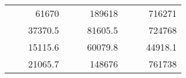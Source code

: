 \begin{table}[H]
\begin{tabular}{|ccrccrccc}
\rowcolor[HTML]{DDFDFF} 
\multicolumn{1}{|c|}{\cellcolor[HTML]{FFFFC7}}                                & \multicolumn{1}{c|}{\cellcolor[HTML]{DDFDFF}}                      & \multicolumn{1}{r|}{\cellcolor[HTML]{DAE8FC}61670}     & \multicolumn{1}{c|}{\cellcolor[HTML]{FFFFC7}}                                & \multicolumn{1}{c|}{\cellcolor[HTML]{DDFDFF}}                       & \multicolumn{1}{r|}{\cellcolor[HTML]{DDFDFF}189618}    & \multicolumn{1}{c|}{\cellcolor[HTML]{FFFFC7}}                                & \multicolumn{1}{c|}{\cellcolor[HTML]{DDFDFF}}                      & \multicolumn{1}{r|}{\cellcolor[HTML]{DDFDFF}716271}    \\ \cline{3-3} \cline{6-6} \cline{9-9} 
\multicolumn{1}{|c|}{\cellcolor[HTML]{FFFFC7}}                                & \multicolumn{1}{c|}{\cellcolor[HTML]{DDFDFF}}                      & \multicolumn{1}{r|}{\cellcolor[HTML]{DDFDFF}37370.5}   & \multicolumn{1}{c|}{\cellcolor[HTML]{FFFFC7}}                                & \multicolumn{1}{c|}{\cellcolor[HTML]{DDFDFF}}                       & \multicolumn{1}{r|}{\cellcolor[HTML]{DAE8FC}81605.5}   & \multicolumn{1}{c|}{\cellcolor[HTML]{FFFFC7}}                                & \multicolumn{1}{c|}{\cellcolor[HTML]{DDFDFF}}                      & \multicolumn{1}{r|}{\cellcolor[HTML]{DAE8FC}724768}    \\ \cline{3-3} \cline{6-6} \cline{9-9} 
\rowcolor[HTML]{DDFDFF} 
\multicolumn{1}{|c|}{\cellcolor[HTML]{FFFFC7}}                                & \multicolumn{1}{c|}{\cellcolor[HTML]{DDFDFF}}                      & \multicolumn{1}{r|}{\cellcolor[HTML]{DAE8FC}15115.6}   & \multicolumn{1}{c|}{\cellcolor[HTML]{FFFFC7}}                                & \multicolumn{1}{c|}{\cellcolor[HTML]{DDFDFF}}                       & \multicolumn{1}{r|}{\cellcolor[HTML]{DDFDFF}60079.8}   & \multicolumn{1}{c|}{\cellcolor[HTML]{FFFFC7}}                                & \multicolumn{1}{c|}{\cellcolor[HTML]{DDFDFF}}                      & \multicolumn{1}{r|}{\cellcolor[HTML]{DDFDFF}44918.1}   \\ \cline{3-3} \cline{6-6} \cline{9-9} 
\multicolumn{1}{|c|}{\cellcolor[HTML]{FFFFC7}}                                & \multicolumn{1}{c|}{\cellcolor[HTML]{DDFDFF}}                      & \multicolumn{1}{r|}{\cellcolor[HTML]{DDFDFF}21065.7}   & \multicolumn{1}{c|}{\cellcolor[HTML]{FFFFC7}}                                & \multicolumn{1}{c|}{\cellcolor[HTML]{DDFDFF}}                       & \multicolumn{1}{r|}{\cellcolor[HTML]{DAE8FC}148676}    & \multicolumn{1}{c|}{\cellcolor[HTML]{FFFFC7}}                                & \multicolumn{1}{c|}{\cellcolor[HTML]{DDFDFF}}                      & \multicolumn{1}{r|}{\cellcolor[HTML]{DAE8FC}761738}    \\ \cline{3-3} \cline{6-6} \cline{9-9} 

\end{tabular}
\end{table}
